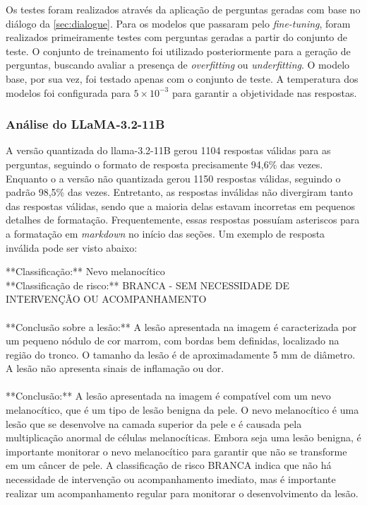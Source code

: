 Os testes foram realizados através da aplicação de perguntas geradas com base no diálogo da \autoref{sec:dialogue}.
Para os modelos que passaram pelo \textit{fine-tuning}, foram realizados primeiramente testes com perguntas geradas a
partir do conjunto de teste. O conjunto de treinamento foi utilizado posteriormente para a geração de perguntas,
buscando avaliar a presença de \textit{overfitting} ou \textit{underfitting}. O modelo base, por sua vez, foi testado
apenas com o conjunto de teste. A temperatura dos modelos foi configurada para \begin{math}5 \times 10^{-3}\end{math}
para garantir a objetividade nas respostas.

\subsubsection{Análise do LLaMA-3.2-11B}

A versão quantizada do \ac{llama}-3.2-11B gerou 1104 respostas válidas para as perguntas, seguindo o formato de
resposta
precisamente 94,6\% das vezes. Enquanto o a versão não quantizada gerou 1150 respostas válidas, seguindo o padrão
98,5\% das vezes. Entretanto, as respostas inválidas não divergiram tanto das respostas válidas, sendo que
a maioria delas estavam incorretas em pequenos detalhes de formatação. Frequentemente, essas respostas possuíam
asteriscos para a formatação em \textit{markdown} no início das seções. Um exemplo de resposta inválida pode ser visto
abaixo:

\begin{dialogue}
     **Classificação:** Nevo melanocítico \\
    **Classificação de risco:** BRANCA - SEM NECESSIDADE DE
    INTERVENÇÃO OU ACOMPANHAMENTO \\ \\
    **Conclusão sobre a lesão:** A lesão apresentada na imagem é caracterizada por um
    pequeno nódulo de cor marrom, com bordas bem definidas, localizado na região do tronco. O tamanho da lesão é de
    aproximadamente 5 mm de diâmetro. A lesão não apresenta sinais de inflamação ou dor. \\ \\
    **Conclusão:** A lesão apresentada na imagem é compatível com um nevo melanocítico, que é um tipo de lesão benigna
    da pele. O nevo melanocítico é uma lesão que se desenvolve na camada superior da pele e é causada pela
    multiplicação anormal de células melanocíticas. Embora seja uma lesão benigna, é importante monitorar o nevo
    melanocítico para garantir que não se transforme em um câncer de pele. A classificação de risco BRANCA indica que
    não há necessidade de intervenção ou acompanhamento imediato, mas é importante realizar um acompanhamento regular
    para monitorar o desenvolvimento da lesão.
\end{dialogue}

